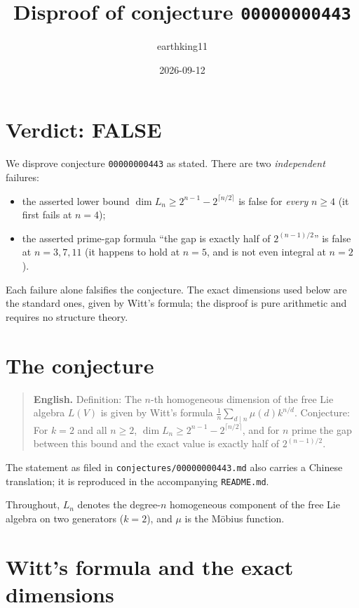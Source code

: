 \documentclass[11pt]{article}
\title{Disproof of conjecture \texttt{00000000443}}
\author{earthking11}
\date{2026-09-12}
\theoremstyle{definition}
\theoremstyle{remark}
\begin{document}
\maketitle

\section*{Verdict: FALSE}

We disprove conjecture \texttt{00000000443} as stated. There are two
\emph{independent} failures:

\begin{itemize}
\item[(A)] the asserted lower bound $\dim L_n \ge 2^{n-1} - 2^{\lceil n/2\rceil}$
  is false for \emph{every} $n \ge 4$ (it first fails at $n = 4$);
\item[(B)] the asserted prime-gap formula
  ``the gap is exactly half of $2^{(n-1)/2}$'' is false at $n = 3, 7, 11$
  (it happens to hold at $n = 5$, and is not even integral at $n = 2$).
\end{itemize}

Each failure alone falsifies the conjecture. The exact dimensions used below are
the standard ones, given by Witt's formula; the disproof is pure arithmetic and
requires no structure theory.

\section{The conjecture}

\begin{quote}
\textbf{English.} Definition: The $n$-th homogeneous dimension of the free Lie
algebra $L(V)$ is given by Witt's formula
$\frac1n\sum_{d\mid n}\mu(d)k^{n/d}$. Conjecture: For $k = 2$ and all $n \ge 2$,
$\dim L_n \ge 2^{n-1} - 2^{\lceil n/2\rceil}$, and for $n$ prime the gap between
this bound and the exact value is exactly half of $2^{(n-1)/2}$.
\end{quote}

The statement as filed in \texttt{conjectures/00000000443.md} also carries a Chinese
translation; it is reproduced in the accompanying \texttt{README.md}.

Throughout, $L_n$ denotes the degree-$n$ homogeneous component of the free Lie
algebra on two generators ($k = 2$), and $\mu$ is the Möbius function.

\section{Witt's formula and the exact dimensions}
\end{document}
